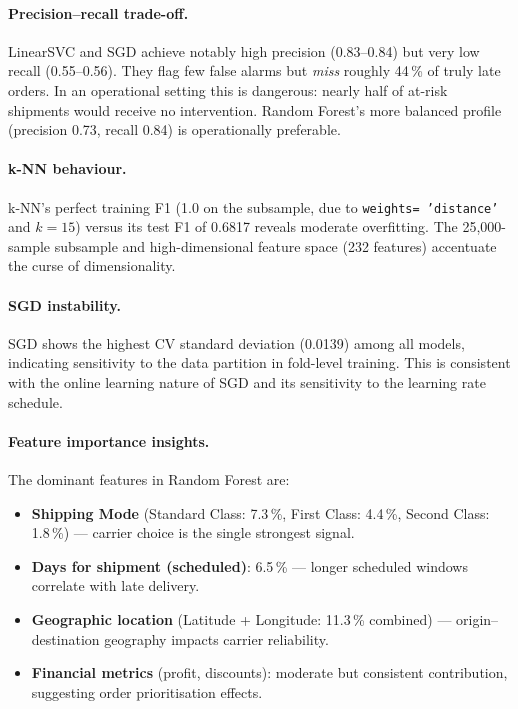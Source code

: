 \documentclass[12pt,a4paper]{article}
\begin{document}
\paragraph{Precision--recall trade-off.}
LinearSVC and SGD achieve notably high precision (0.83--0.84) but very low
recall (0.55--0.56). They flag few false alarms but \emph{miss} roughly 44\,\%
of truly late orders. In an operational setting this is dangerous: nearly half
of at-risk shipments would receive no intervention. Random Forest's more
balanced profile (precision 0.73, recall 0.84) is operationally preferable.

\paragraph{k-NN behaviour.}
k-NN's perfect training F1 (1.0 on the subsample, due to \texttt{weights=
'distance'} and $k=15$) versus its test F1 of 0.6817 reveals moderate
overfitting. The 25,000-sample subsample and high-dimensional feature space
(232 features) accentuate the curse of dimensionality.

\paragraph{SGD instability.}
SGD shows the highest CV standard deviation (0.0139) among all models,
indicating sensitivity to the data partition in fold-level training. This is
consistent with the online learning nature of SGD and its sensitivity to the
learning rate schedule.

\paragraph{Feature importance insights.}
The dominant features in Random Forest are:
\begin{itemize}[itemsep=2pt]
  \item \textbf{Shipping Mode} (Standard Class: 7.3\,\%, First Class: 4.4\,\%,
        Second Class: 1.8\,\%) --- carrier choice is the single strongest signal.
  \item \textbf{Days for shipment (scheduled)}: 6.5\,\% --- longer scheduled
        windows correlate with late delivery.
  \item \textbf{Geographic location} (Latitude + Longitude: 11.3\,\% combined)
        --- origin--destination geography impacts carrier reliability.
  \item \textbf{Financial metrics} (profit, discounts): moderate but
        consistent contribution, suggesting order prioritisation effects.
\end{itemize}
\end{document}
